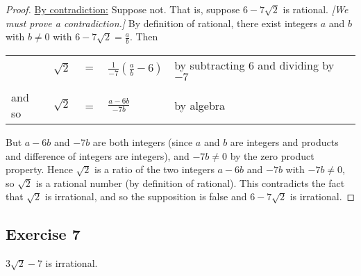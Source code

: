 \documentclass[14pt]{extarticle}
\newcommand{\dps}{\displaystyle}
\newcommand{\cy}{\color{cyan}}
\begin{document}
\begin{proof}
    \underline{By contradiction:} Suppose not. That is, suppose
    $6 - 7\sqrt{2}$ is rational. {\it [We must prove a contradiction.]} By definition of rational, there exist integers $a$ and $b$ with $b \neq 0$ with $6 - 7\sqrt{2} = \frac{a}{b}$. Then

    \begin{center}
        \begin{tabular}{lrcll}
                   & $\sqrt{2}$ & $=$ & $\dps\frac{1}{-7}\left(\frac{a}{b} - 6\right) $ & {\cy by subtracting 6 and dividing by $-7$} \\
            \\
            and so & $\sqrt{2}$ & =   & $\dps\frac{a-6b}{-7b}$                          & {\cy by algebra}                            \\
        \end{tabular}
    \end{center}

    But $a - 6b$ and $-7b$ are both integers (since $a$ and $b$ are integers and products and difference of integers are integers), and $-7b \neq 0$ by the zero product property. Hence $\sqrt{2}$ is a ratio of the two integers $a - 6b$ and $-7b$ with $-7b \neq 0$, so $\sqrt{2}$ is a rational number (by definition of rational). This contradicts the fact that $\sqrt{2}$ is irrational, and so the supposition is false and $6 - 7 \sqrt{2}$ is irrational.
\end{proof}

\subsection{Exercise 7}
$3\sqrt{2} - 7$ is irrational.
\end{document}
